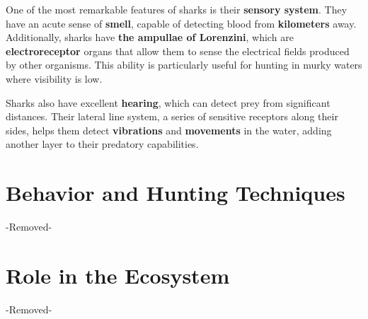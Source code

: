 One of the most remarkable features of sharks is their \textbf{sensory system}. They have an acute sense of \textbf{smell}, capable of detecting blood from \textbf{kilometers} away. Additionally, sharks have \textbf{the ampullae of Lorenzini}, which are \textbf{electroreceptor} organs that allow them to sense the electrical fields produced by other organisms. This ability is particularly useful for hunting in murky waters where visibility is low.

Sharks also have excellent \textbf{hearing}, which can detect prey from significant distances. Their lateral line system, a series of sensitive receptors along their sides, helps them detect \textbf{vibrations} and \textbf{movements} in the water, adding another layer to their predatory capabilities.

\section{Behavior and Hunting Techniques} -Removed-


\section{Role in the Ecosystem} -Removed-


